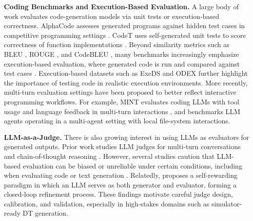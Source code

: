\documentclass{ieeeaccess}
\begin{document}
\noindent\textbf{Coding Benchmarks and Execution-Based Evaluation.}
A large body of work evaluates code-generation models via unit tests or execution-based correctness.
AlphaCode assesses generated programs against hidden test cases in competitive programming settings \cite{li2022competition}.
CodeT uses self-generated unit tests to score correctness of function implementations \cite{chen2022codet}.
Beyond similarity metrics such as BLEU \cite{Papineni2002BleuAM}, ROUGE \cite{lin-2004-rouge}, and CodeBLEU \cite{ren2020codebleu}, many benchmarks increasingly emphasize execution-based evaluation, where generated code is run and compared against test cases \cite{austin2021program, chen2021evaluating, huang-etal-2022-execution, Lai2022DS1000, hendrycksapps2021}.
Execution-based datasets such as ExeDS \cite{huang-etal-2022-execution} and ODEX \cite{wang2023executionbased} further highlight the importance of testing code in realistic execution environments.
More recently, multi-turn evaluation settings have been proposed to better reflect interactive programming workflows.
For example, MINT evaluates coding LLMs with tool usage and language feedback in multi-turn interactions \cite{wang2024mintevaluatingllmsmultiturn}, and \cite{zhang2024pybenchevaluatingllmagent} benchmarks LLM agents operating in a multi-agent setting with local file-system interactions.

\noindent\textbf{LLM-as-a-Judge.}
There is also growing interest in using LLMs as evaluators for generated outputs.
Prior work studies LLM judges for multi-turn conversations and chain-of-thought reasoning \cite{zheng2023LLMasJudge}.
However, several studies caution that LLM-based evaluation can be biased or unreliable under certain conditions, including when evaluating code or text generation \cite{abdelaziz2021AAAI_benchmark_code_understanding, wang2023llm_unfair_eval}.
Relatedly, \cite{yuan2024selfrewardinglanguagemodels} proposes a self-rewarding paradigm in which an LLM serves as both generator and evaluator, forming a closed-loop refinement process.
These findings motivate careful judge design, calibration, and validation, especially in high-stakes domains such as simulator-ready DT generation.
\end{document}
